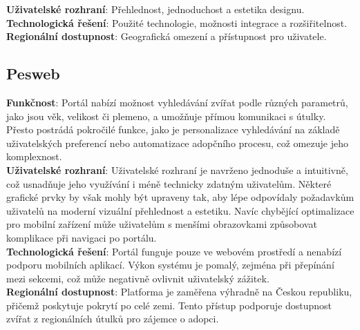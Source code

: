 \documentclass[12pt,a4paper]{report}
\begin{document}
\noindent\textbf{Uživatelské rozhraní}: Přehlednost, jednoduchost a estetika designu.\\

\noindent\textbf{Technologická řešení}: Použité technologie, možnosti integrace a rozšiřitelnost.\\

\noindent\textbf{Regionální dostupnost}: Geografická omezení a přístupnost pro uživatele.\\

\subsection{Pesweb}

\noindent \textbf{Funkčnost}: Portál nabízí možnost vyhledávání zvířat podle různých parametrů, jako jsou věk, velikost či plemeno, a umožňuje přímou komunikaci s útulky. Přesto postrádá pokročilé funkce, jako je personalizace vyhledávání na základě uživatelských preferencí nebo automatizace adopčního procesu, což omezuje jeho komplexnost.\\

\noindent \textbf{Uživatelské rozhraní}: Uživatelské rozhraní je navrženo jednoduše a intuitivně, což usnadňuje jeho využívání i méně technicky zdatným uživatelům. Některé grafické prvky by však mohly být upraveny tak, aby lépe odpovídaly požadavkům uživatelů na moderní vizuální přehlednost a estetiku. Navíc chybějící optimalizace pro mobilní zařízení může uživatelům s menšími obrazovkami způsobovat komplikace při navigaci po portálu.\\

\noindent\textbf{Technologická řešení}: Portál funguje pouze ve webovém prostředí a nenabízí podporu mobilních aplikací. Výkon systému je pomalý, zejména při přepínání mezi sekcemi, což může negativně ovlivnit uživatelský zážitek.\\

\noindent \textbf{Regionální dostupnost}: Platforma je zaměřena výhradně na Českou republiku, přičemž poskytuje pokrytí po celé zemi. Tento přístup podporuje dostupnost zvířat z regionálních útulků pro zájemce o adopci.\\
\end{document}
